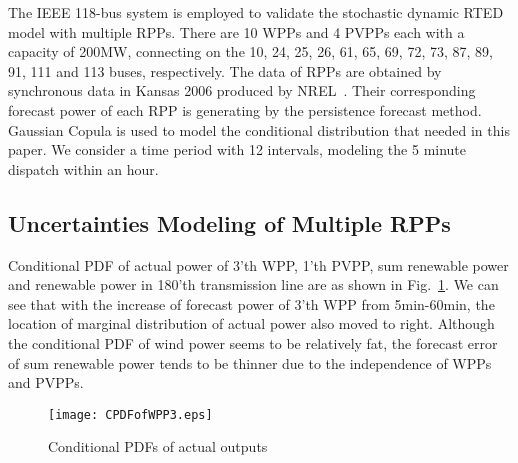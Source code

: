 
The IEEE 118-bus system is employed to validate the stochastic dynamic RTED model with multiple RPPs. There are 10 WPPs and 4 PVPPs each with a capacity of 200MW, {connecting on the 10, 24, 25, 26, 61, 65, 69, 72, 73, 87, 89, 91, 111 and 113 buses, respectively.} The data of RPPs are obtained by synchronous data in Kansas 2006 produced by NREL~\cite{Nrel}.
Their corresponding forecast power of each RPP is generating by the persistence forecast method. Gaussian Copula is used to model the conditional distribution that needed in this paper. We consider a time period with 12 intervals, modeling the 5 minute dispatch within an hour.


\subsection {Uncertainties Modeling of Multiple RPPs}

Conditional PDF of actual power of 3'th WPP, 1'th PVPP, sum renewable power and renewable power in 180'th transmission line  are as shown in Fig.~\ref{actual}. We can see that with the increase of forecast power of 3'th WPP from 5min-60min, the location of marginal distribution of actual power also moved to right. Although the conditional PDF of wind power seems to be relatively fat, the forecast error of sum renewable power tends to be thinner due to the independence of WPPs and PVPPs.
\begin{figure}[ht]
	\begin{center}
		\texttt{[image: CPDFofWPP3.eps]}\\
		\caption{Conditional PDFs of actual outputs}\label{actual}
	\end{center}
\end{figure}


